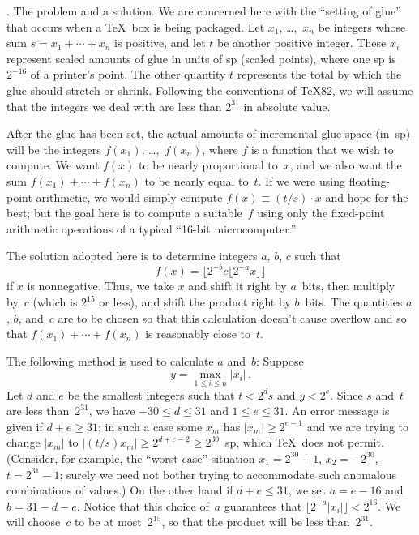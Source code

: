 .  The problem and a solution.
We are concerned here with the ``setting of glue'' that occurs when a
\TeX\ box is being packaged. Let $x_1$, \dots,~$x_n$ be integers whose sum
$s=x_1+\cdots+x_n$ is positive, and let $t$ be another positive integer.
These $x_i$ represent scaled amounts of glue in units of sp (scaled
points), where one sp is $2^{-16}$ of a printer's point. The other
quantity $t$ represents the total by which the glue should stretch or
shrink. Following the conventions of \TeX82, we will assume that the
integers we deal with are less than $2^{31}$ in absolute value.

After the glue has been set, the actual amounts of incremental glue space
(in~sp) will be the integers $f(x_1)$, \dots,~$f(x_n)$, where $f$ is a
function that we wish to compute. We want $f(x)$ to be nearly proportional
to~$x$, and we also want the sum $f(x_1)+\cdots+f(x_n)$ to be nearly
equal to~$t$. If we were using floating-point arithmetic, we would simply
compute $f(x)\equiv(t/s)\cdot x$ and hope for the best; but the goal here
is to compute a suitable~$f$ using only the fixed-point arithmetic operations
of a typical ``16-bit microcomputer.''

The solution adopted here is to determine integers $a$, $b$, $c$ such that
$$f(x)=\bigl\lfloor 2^{-b}c\lfloor 2^{-a}x\rfloor\bigr\rfloor$$
if $x$ is nonnegative. Thus, we take $x$ and shift it right by $a$~bits,
then multiply by~$c$ (which is $2^{15}$ or less), and shift the product
right by $b$~bits. The quantities $a$, $b$, and~$c$ are to be chosen
so that this calculation doesn't cause overflow and so that $f(x_1)+\cdots
+f(x_n)$ is reasonably close to~$t$.

The following method is used to calculate $a$ and~$b$:
Suppose $$y=\max_{1\le i\le n}\vert x_i\vert\,.$$
Let $d$ and $e$ be the smallest integers such that $t<2^ds$ and $y<2^e$.
Since $s$ and~$t$ are less than~$2^{31}$, we have $-30\le d\le31$ and
$1\le e\le31$. An error message is given if $d+e\ge31$; in such a case
some $x_m$ has $\vert x_m\vert\ge 2^{e-1}$ and we are trying to change
$\vert x_m\vert$ to $\vert(t/s)x_m\vert\ge2^{d+e-2}\ge2^{30}$~sp, which
\TeX\ does not permit. (Consider, for example, the ``worst case'' situation
$x_1=2^{30}+1$, $x_2=-2^{30}$, $t=2^{31}-1$; surely we need not bother
trying to accommodate such anomalous combinations of values.) On the other
hand if $d+e\le31$, we set $a=e-16$ and $b=31-d-e$. Notice that this choice
of~$a$ guarantees that $\lfloor2^{-a}\vert x_i\vert\rfloor<2^{16}$. We will
choose~$c$ to be at most~$2^{15}$, so that the product will be less
than~$2^{31}$.

